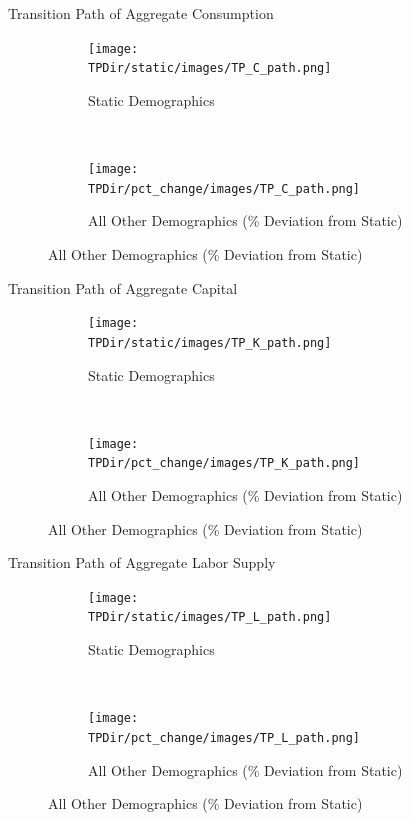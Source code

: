 \documentclass[12pt]{beamer}
\newcommand*{\TPDir}{../code/Rick/OUTPUT/TP}
\begin{document}
\begin{frame}{Transition Path of Aggregate Consumption}

	\begin{figure}[H]
		\begin{subfigure}{0.5\textwidth}
		   \centering
		   \texttt{[image: \\TPDir/static/images/TP\_C\_path.png]}
		   \caption{Static Demographics}
		\end{subfigure}%
		~
		\begin{subfigure}{0.5\textwidth}
		   \centering
		   \texttt{[image: \\TPDir/pct\_change/images/TP\_C\_path.png]}
		   \caption{All Other Demographics (\% Deviation from Static)}
		\end{subfigure}
	 \end{figure}

\end{frame}

\begin{frame}{Transition Path of Aggregate Capital}

	\begin{figure}[H]
		\caption{\label{fig:tp_K_pct}Time Path of Aggregate Capital \(\hat{K}_t\)}
		\begin{subfigure}{0.5\textwidth}
		   \centering
		   \texttt{[image: \\TPDir/static/images/TP\_K\_path.png]}
		   \caption{Static Demographics}
		\end{subfigure}%
		~
		\begin{subfigure}{0.5\textwidth}
		   \centering
		   \texttt{[image: \\TPDir/pct\_change/images/TP\_K\_path.png]}
		   \caption{All Other Demographics (\% Deviation from Static)}
		\end{subfigure}
	 \end{figure}

\end{frame}

\begin{frame}{Transition Path of Aggregate Labor Supply}

	\begin{figure}[H]
		\begin{subfigure}{0.5\textwidth}
		   \centering
		   \texttt{[image: \\TPDir/static/images/TP\_L\_path.png]}
		   \caption{Static Demographics}
		\end{subfigure}%
		~
		\begin{subfigure}{0.5\textwidth}
		   \centering
		   \texttt{[image: \\TPDir/pct\_change/images/TP\_L\_path.png]}
		   \caption{All Other Demographics (\% Deviation from Static)}
		\end{subfigure}
	 \end{figure}

\end{frame}
\end{document}
